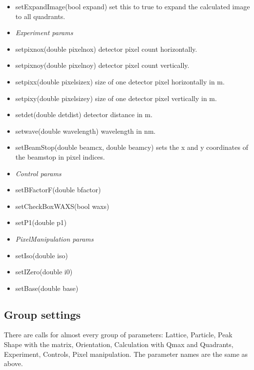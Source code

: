 \documentclass[11pt]{article} %
\begin{document}
\begin{itemize}
\item setExpandImage(bool expand) set this to true to expand the calculated image to all quadrants.
% 
\item[] {\it Experiment params}
\item setpixnox(double pixelnox) detector pixel count horizontally.
\item setpixnoy(double pixelnoy) detector pixel count vertically.
\item setpixx(double pixelsizex) size of one detector pixel horizontally in m.
\item setpixy(double pixelsizey) size of one detector pixel vertically in m.
\item setdet(double detdist) detector distance in m.
\item setwave(double wavelength) wavelength in nm.
\item setBeamStop(double beamcx, double beamcy) sets the x and y coordinates of the beamstop in pixel indices.
% 
\item[] {\it Control params}
\item setBFactorF(double bfactor)
\item setCheckBoxWAXS(bool waxs)
\item setP1(double p1)
% 
\item[] {\it PixelManipulation params}
\item setIso(double iso)
\item setIZero(double i0)
\item setBase(double base)
\end{itemize}


\subsection{Group settings}

There are calls for almost every group of parameters: Lattice, Particle, Peak Shape with the matrix, Orientation, Calculation with Qmax and Quadrants, Experiment, Controls, Pixel manipulation. The parameter names are the same as above.
\end{document}
